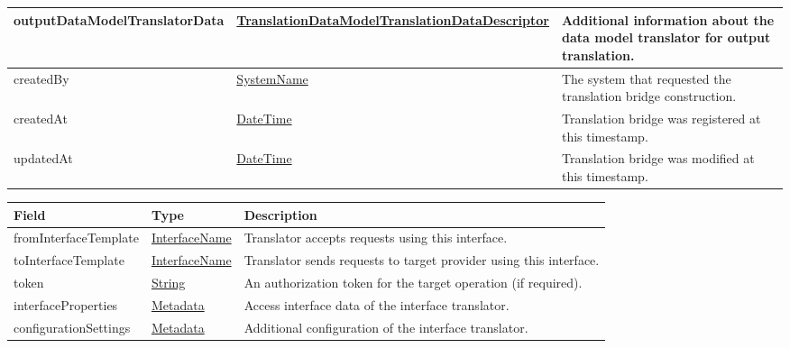 \documentclass[a4paper]{arrowhead}
\newcommand{\pref}[1]{{\textcolor{ArrowheadGrey}{\hyperref[sec:model:primitives:#1]{#1}}}}
\begin{document}
\begin{table}[ht!]
\begin{tabularx}{\textwidth}{| p{5cm} | p{5.2cm} | X |}
outputDataModelTranslatorData & \hyperref[sec:model:TranslationDataModelTranslationDataDescriptor]{Translation\-Data\-Model\-Translation\-Data\-Descriptor} & Additional information about the data model translator for output translation. \\ \hline
createdBy & \pref{SystemName} & The system that requested the translation bridge construction. \\ \hline
createdAt & \pref{DateTime} & Translation bridge was registered at this timestamp. \\ \hline
updatedAt & \pref{DateTime} & Translation bridge was modified at this timestamp. \\ \hline
\end{tabularx}
\end{table}

\clearpage


\begin{table}[ht!]
\begin{tabularx}{\textwidth}{| p{4.5cm} | p{3.5cm} | X |} \hline
\rowcolor{gray!33} Field & Type      & Description \\ \hline
fromInterfaceTemplate & \pref{InterfaceName} & Translator accepts requests using this interface. \\ \hline
toInterfaceTemplate & \pref{InterfaceName} & Translator sends requests to target provider using this interface. \\ \hline
token & \pref{String} & An authorization token for the target operation (if required). \\ \hline
interfaceProperties &\hyperref[sec:model:Metadata]{Metadata} & Access interface data of the interface translator. \\ \hline
configurationSettings &\hyperref[sec:model:Metadata]{Metadata} & Additional configuration of the interface translator. \\ \hline
\end{tabularx}
\end{table}

\end{document}
